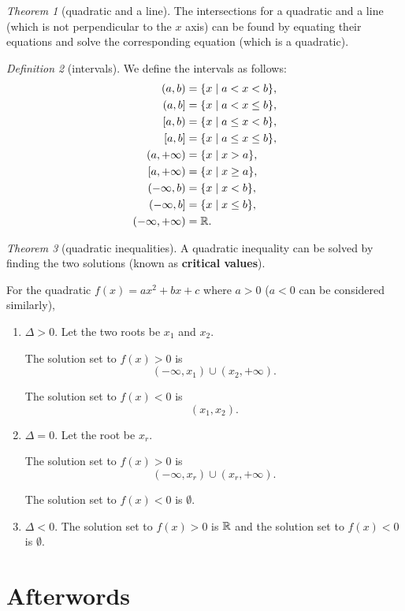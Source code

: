\documentclass[8pt]{article}
\theoremstyle{remark}
\newtheorem{theorem}{Theorem}[section]
\newtheorem{definition}[theorem]{Definition}
\begin{document}
        \begin{theorem}[quadratic and a line]
            The intersections for a quadratic and a line (which is not perpendicular to the $x$ axis) can be found by equating their equations and solve the corresponding equation (which is a quadratic).
        \end{theorem}

        \begin{definition}[intervals]
            We define the intervals as follows:
            \begin{align*}
                (a, b) &= \{x \mid a < x < b\},\\
                (a, b] &= \{x \mid a < x \leq b\},\\
                [a, b) &= \{x \mid a \leq x < b\},\\
                [a, b] &= \{x \mid a \leq x \leq b\},\\
                (a, +\infty) &= \{x \mid x > a\},\\
                [a, +\infty) &= \{x \mid x \geq a\},\\
                (-\infty, b) &= \{x \mid x < b\},\\
                (-\infty, b] &= \{x \mid x \leq b\},\\
                (-\infty, +\infty) &= \mathbb{R}.
            \end{align*}
        \end{definition}

        \begin{theorem}[quadratic inequalities]
            A quadratic inequality can be solved by finding the two solutions (known as \textbf{critical values}).

            For the quadratic $f(x) = ax^2 + bx + c$ where $a > 0$ ($a < 0$ can be considered similarly),
            \begin{enumerate}
                \item $\Delta > 0$. Let the two roots be $x_1$ and $x_2$.
                
                The solution set to $f(x) > 0$ is
                $$
                    (-\infty, x_1) \cup (x_2, +\infty).
                $$

                The solution set to $f(x) < 0$ is
                $$
                    (x_1, x_2).
                $$

                \item $\Delta = 0$. Let the root be $x_r$.
                
                The solution set to $f(x) > 0$ is
                $$
                    (-\infty, x_r) \cup (x_r, +\infty).
                $$

                The solution set to $f(x) < 0$ is $\emptyset$.

                \item $\Delta < 0$. The solution set to $f(x) > 0$ is $\mathbb{R}$ and the solution set to $f(x) < 0$ is $\emptyset$.
            \end{enumerate}
        \end{theorem}

    \section*{Afterwords}
        
\end{document}
